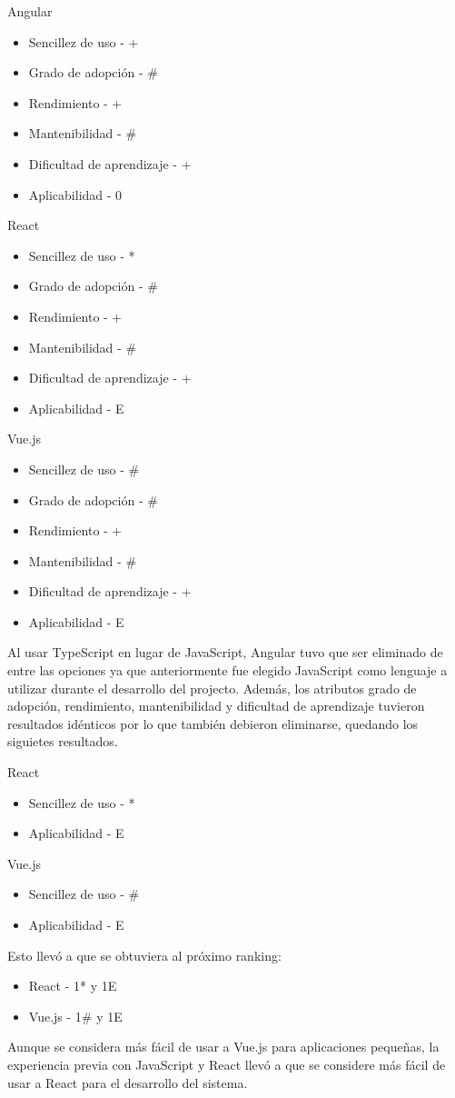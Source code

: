 \documentclass[twoside]{article}
\begin{document}
Angular
\begin{itemize}
    \item Sencillez de uso - +
    \item Grado de adopción - \#
    \item Rendimiento - +
    \item Mantenibilidad - \#
    \item Dificultad de aprendizaje - +
    \item Aplicabilidad - 0
\end{itemize}
React
\begin{itemize}
    \item Sencillez de uso - *
    \item Grado de adopción - \#
    \item Rendimiento - +
    \item Mantenibilidad - \#
    \item Dificultad de aprendizaje - +
    \item Aplicabilidad - E
\end{itemize}
Vue.js
\begin{itemize}
    \item Sencillez de uso - \#
    \item Grado de adopción - \#
    \item Rendimiento - +
    \item Mantenibilidad - \#
    \item Dificultad de aprendizaje - +
    \item Aplicabilidad - E
\end{itemize}
Al usar TypeScript en lugar de JavaScript, Angular tuvo que ser eliminado de entre las opciones ya que anteriormente fue elegido JavaScript como lenguaje a utilizar durante el desarrollo del projecto. Además, los atributos grado de adopción, rendimiento, mantenibilidad y dificultad de aprendizaje tuvieron resultados idénticos por lo que también debieron eliminarse, quedando los siguietes resultados.

React
\begin{itemize}
    \item Sencillez de uso - *
    \item Aplicabilidad - E
\end{itemize}
Vue.js
\begin{itemize}
    \item Sencillez de uso - \#
    \item Aplicabilidad - E
\end{itemize}
Esto llevó a que se obtuviera al próximo ranking:
\begin{itemize}
    \item React - 1* y 1E
    \item Vue.js - 1\# y 1E
\end{itemize}
Aunque se considera más fácil de usar a Vue.js para aplicaciones pequeñas, la experiencia previa con JavaScript y React llevó a que se considere más fácil de usar a React para el desarrollo del sistema.
\end{document}
